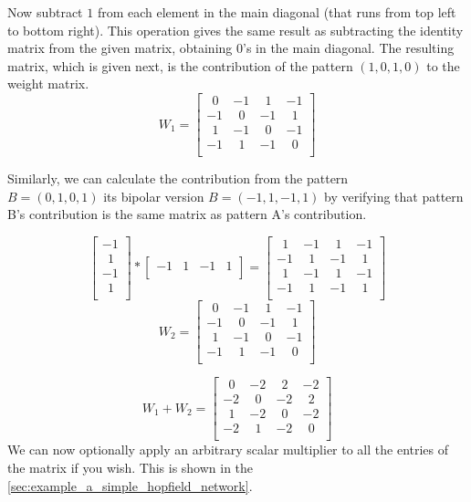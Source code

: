 \documentclass[12pt, right open]{memoir}
\newcommand{\matplus}{
~~
  }
\begin{document}
Now subtract $1$ from each element in the main diagonal (that runs from top left
to bottom right). This operation gives the same result as subtracting the
identity matrix from the given matrix, obtaining $0$’s in the main diagonal. The
resulting matrix, which is given next, is the contribution of the pattern $(1, 0, 1,
0)$ to the weight matrix.
\[
 W_1 = \begin{bmatrix}
 \matplus0 & -1 &  \matplus1 & -1 \\
-1 &  \matplus0 & -1 &  \matplus1 \\
 \matplus1 & -1 &  \matplus0 & -1 \\
-1 &  \matplus1 & -1 &  \matplus0 \\
\end{bmatrix}
\]

Similarly, we can calculate the contribution from the pattern \\ $B = (0, 1, 0, 1)$ its bipolar version $B = (-1, 1, -1, 1)$ by verifying that pattern B's contribution is the same matrix as pattern A's contribution.

\[ 
\begin{bmatrix}
 -1  \\
  \matplus1  \\
 -1  \\
  \matplus1  \\
\end{bmatrix}
*
\begin{bmatrix}
 -1 & 1 & -1 & 1  \\
\end{bmatrix}
=
\begin{bmatrix}
 \matplus1 & -1 &  \matplus1 & -1 \\
-1 &  \matplus1 & -1 &  \matplus1 \\
 \matplus1 & -1 &  \matplus1 & -1 \\
-1 &  \matplus1 & -1 &  \matplus1 \\
\end{bmatrix}
\]
\[
W_2 =
\begin{bmatrix}
 \matplus0 & -1 &  \matplus1 & -1 \\
-1 &  \matplus0 & -1 &  \matplus1 \\
 \matplus1 & -1 &  \matplus0 & -1 \\
-1 &  \matplus1 & -1 &  \matplus0 \\
\end{bmatrix}
\]

\[
W_1 + W_2 =
\begin{bmatrix}
 \matplus0 & -2 &  \matplus2 & -2 \\
-2 &  \matplus0 & -2 &  \matplus2 \\
 \matplus1 & -2 &  \matplus0 & -2 \\
-2 &  \matplus1 & -2 &  \matplus0 \\
\end{bmatrix}
\]
We can now optionally apply an arbitrary scalar multiplier to all the entries of
the matrix if you wish. This is shown in the \ref{sec:example_a_simple_hopfield_network}.
\end{document}
